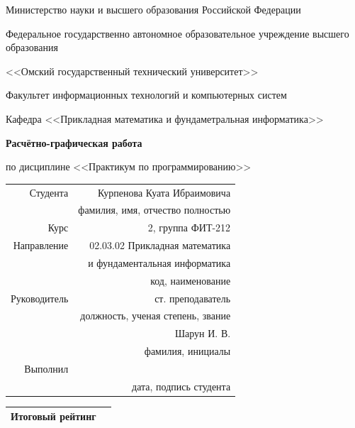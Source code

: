 \documentclass[14pt, a4paper]{article}
\begin{document}
    \thispagestyle{empty}

    \begin{center}
        Министерство науки и высшего образования Российской Федерации

        Федеральное государственно автономное образовательное учреждение высшего образования

        <<Омский государственный технический университет>>

        \vspace{1cm}
        Факультет информационных технологий и компьютерных систем

        Кафедра <<Прикладная математика и фундаметральная информатика>>

        \vspace{3cm}
        \textbf{Расчётно-графическая работа}

        по дисциплине <<Практикум по программированию>>
    \end{center}
    
    \vspace{3cm}
    \begin{flushright}    
        \begin{tabular}{ r r }
            Студента & Курпенова Куата Ибраимовича \\
            \cline{2-2}
            & \tiny{фамилия, имя, отчество полностью} \\

            Курс & 2, группа ФИТ-212 \\
            \cline{2-2}
            Направление & 02.03.02 Прикладная математика \\
            \cline{2-2}
            & и фундаментальная информатика \\
            \cline{2-2}
            & \tiny{код, наименование} \\
            
            Руководитель & ст. преподаватель \\
            \cline{2-2}
            & \tiny{должность, ученая степень, звание} \\
            & Шарун И. В. \\
            \cline{2-2}
            & \tiny{фамилия, инициалы} \\
            
            Выполнил & \\
            \cline{2-2}
            & \tiny{дата, подпись студента} \\
        \end{tabular}

        \vspace{1cm}

        \begin{tabular}{ | c | c | }
            \hline
            Итоговый рейтинг & \\
            \hline
        \end{tabular}
    \end{flushright}
    
\end{document}
